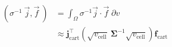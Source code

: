 \begin{equation}
\begin{aligned}
\left(\sigma^{-1}~\vec{j}, \vec{f}~\right) &=
\int_{\Omega}{\sigma^{-1}\vec{j} \cdot \vec{f}} \; {\partial v} \\
&\approx
\mathbf{j}_\text{cart}^{\top} \left(\sqrt{v_{\text{cell}}} ~ \boldsymbol{\Sigma}^{-1} \sqrt{v_{\text{cell}}} \right)  \mathbf{f}_\text{cart}
\end{aligned}
\end{equation}
